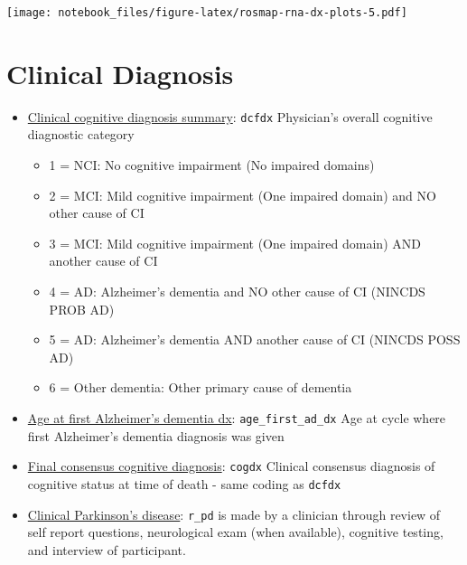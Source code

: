 \documentclass[]{book}
\providecommand{\tightlist}{%
  \setlength{\itemsep}{0pt}\setlength{\parskip}{0pt}}
\begin{document}
\texttt{[image: notebook\_files/figure-latex/rosmap-rna-dx-plots-5.pdf]}

\hypertarget{clinical-diagnosis}{%
\section{Clinical Diagnosis}\label{clinical-diagnosis}}

\begin{itemize}
\tightlist
\item
  \href{https://www.radc.rush.edu/docs/var/detail.htm?category=Clinical+Diagnosis\&subcategory=Final+consensus+diagnosis\&variable=cogdx}{Clinical cognitive diagnosis summary}: \texttt{dcfdx} Physician's overall cognitive diagnostic category

  \begin{itemize}
  \tightlist
  \item
    1 = NCI: No cognitive impairment (No impaired domains)
  \item
    2 = MCI: Mild cognitive impairment (One impaired domain) and NO other cause of CI
  \item
    3 = MCI: Mild cognitive impairment (One impaired domain) AND another cause of CI
  \item
    4 = AD: Alzheimer's dementia and NO other cause of CI (NINCDS PROB AD)
  \item
    5 = AD: Alzheimer's dementia AND another cause of CI (NINCDS POSS AD)
  \item
    6 = Other dementia: Other primary cause of dementia
  \end{itemize}
\item
  \href{https://www.radc.rush.edu/docs/var/detail.htm?category=Clinical+Diagnosis\&subcategory=Dementia\&variable=age_first_ad_dx}{Age at first Alzheimer's dementia dx}: \texttt{age\_first\_ad\_dx} Age at cycle where first Alzheimer's dementia diagnosis was given
\item
  \href{https://www.radc.rush.edu/docs/var/detail.htm?category=Clinical+Diagnosis\&subcategory=Final+consensus+diagnosis\&variable=cogdx}{Final consensus cognitive diagnosis}: \texttt{cogdx} Clinical consensus diagnosis of cognitive status at time of death - same coding as \texttt{dcfdx}
\item
  \href{https://www.radc.rush.edu/docs/var/detail.htm?category=Clinical+Diagnosis\&subcategory=Parkinson\%27s+disease\&variable=r_pd}{Clinical Parkinson's disease}: \texttt{r\_pd} is made by a clinician through review of self report questions, neurological exam (when available), cognitive testing, and interview of participant.


\end{itemize}
\end{document}
